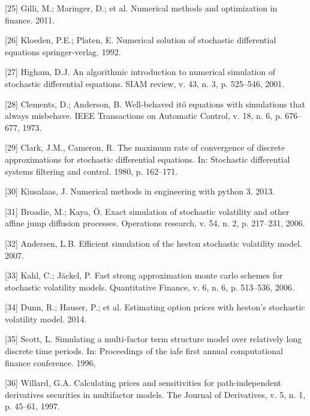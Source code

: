 \documentclass[12pt,oneside]{reedthesis}
\theoremstyle{definition}
\theoremstyle{definition}
\theoremstyle{remark}
\begin{document}
  \hypertarget{ref-gilli_numerical_2011}{}
  {[}25{]} Gilli, M.; Maringer, D.; et al. Numerical methods and
  optimization in finance. 2011.
  
  \hypertarget{ref-kloeden1992}{}
  {[}26{]} Kloeden, P.E.; Platen, E. Numerical solution of stochastic
  differential equations springer-verlag. 1992.
  
  \hypertarget{ref-higham2001}{}
  {[}27{]} Higham, D.J. An algorithmic introduction to numerical
  simulation of stochastic differential equations. SIAM review, v. 43, n.
  3, p. 525--546, 2001.
  
  \hypertarget{ref-clements1973well}{}
  {[}28{]} Clements, D.; Anderson, B. Well-behaved itô equations with
  simulations that always misbehave. IEEE Transactions on Automatic
  Control, v. 18, n. 6, p. 676--677, 1973.
  
  \hypertarget{ref-clark1980maximum}{}
  {[}29{]} Clark, J.M., Cameron, R. The maximum rate of convergence of
  discrete approximations for stochastic differential equations. In:
  Stochastic differential systems filtering and control. 1980, p.
  162--171.
  
  \hypertarget{ref-kiusalaas2013numerical}{}
  {[}30{]} Kiusalaas, J. Numerical methods in engineering with python 3.
  2013.
  
  \hypertarget{ref-broadie2006exact}{}
  {[}31{]} Broadie, M.; Kaya, Ö. Exact simulation of stochastic volatility
  and other affine jump diffusion processes. Operations research, v. 54,
  n. 2, p. 217--231, 2006.
  
  \hypertarget{ref-andersen}{}
  {[}32{]} Andersen, L.B. Efficient simulation of the heston stochastic
  volatility model. 2007.
  
  \hypertarget{ref-kahl2006fast}{}
  {[}33{]} Kahl, C.; Jäckel, P. Fast strong approximation monte carlo
  schemes for stochastic volatility models. Quantitative Finance, v. 6, n.
  6, p. 513--536, 2006.
  
  \hypertarget{ref-dunn2014estimating}{}
  {[}34{]} Dunn, R.; Hauser, P.; et al. Estimating option prices with
  heston's stochastic volatility model. 2014.
  
  \hypertarget{ref-scott1996}{}
  {[}35{]} Scott, L. Simulating a multi-factor term structure model over
  relatively long discrete time periods. In: Proceedings of the iafe first
  annual computational finance conference. 1996,
  
  \hypertarget{ref-willard1997}{}
  {[}36{]} Willard, G.A. Calculating prices and sensitivities for
  path-independent derivatives securities in multifactor models. The
  Journal of Derivatives, v. 5, n. 1, p. 45--61, 1997.
  
\end{document}
